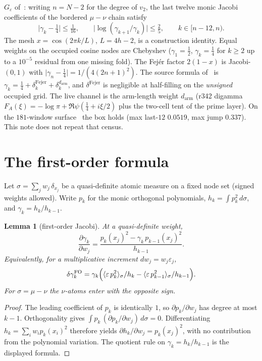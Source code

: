 \documentclass[11pt]{article}
\newtheorem{lemma}{Lemma}
\theoremstyle{remark}
\begin{document}
$G_\varepsilon$ of~\cite{v3p}: writing $n=N-2$
for the degree of $v_2$, the last twelve monic Jacobi coefficients
of the bordered $\mu-\nu$ chain satisfy
\begin{equation}\label{eq:geps}
\bigl\lvert\gamma_k-\tfrac14\bigr\rvert\le\tfrac1{16},
\qquad
\bigl\lvert\log(\gamma_{k+1}/\gamma_k)\bigr\rvert\le\tfrac25,
\qquad
k\in[n-12,n).
\end{equation}
The mesh $x=\cos(2\pi k/L)$, $L=4h-2$, is a construction identity.
Equal weights on the occupied cosine nodes are Chebyshev
($\gamma_1=\tfrac12$, $\gamma_k=\tfrac14$ for $k\ge 2$ up to a
$10^{-5}$ residual from one missing fold).
The Fej\'er factor $2(1-x)$ is Jacobi-$(0,1)$ with
$\lvert\gamma_n-\tfrac14\rvert=1/(4(2n+1)^2)$.
The source formula of~\cite{v3p} is
$\gamma_k=\tfrac14+\delta_k^{\mathrm{Fejer}}+\delta_k^{d_{\mathrm{arm}}}$,
and $\delta^{\mathrm{Fejer}}$ is negligible at half-filling on the
\emph{unsigned} occupied grid.
The live channel is the arm-length weight $d_{\mathrm{arm}}$
(r342 digamma $F_A(\xi)=-\log\pi+\Re\psi(\tfrac14+i\xi/2)$ plus
the two-cell tent of the prime layer).
On the $181$-window surface~\cite{v3p} the box holds
(max last-$12$ $0.0519$, max jump $0.337$).
This note does not repeat that census.

\section{The first-order formula}\label{sec:fo}

Let $\sigma=\sum_j w_j\,\delta_{x_j}$ be a quasi-definite atomic
measure on a fixed node set (signed weights allowed).
Write $p_k$ for the monic orthogonal polynomials,
$h_k=\int p_k^2\,d\sigma$, and $\gamma_k=h_k/h_{k-1}$.

\begin{lemma}[first-order Jacobi]\label{lem:fo}
At a quasi-definite weight,
\[
\frac{\partial\gamma_k}{\partial w_j}
=
\frac{p_k(x_j)^2-\gamma_k\,p_{k-1}(x_j)^2}{h_{k-1}}.
\]
Equivalently, for a multiplicative increment $dw_j=w_j\varepsilon_j$,
\[
\delta\gamma_k^{\mathrm{FO}}
=
\gamma_k\Bigl(\langle\varepsilon\,p_k^2\rangle_\sigma/h_k
-\langle\varepsilon\,p_{k-1}^2\rangle_\sigma/h_{k-1}\Bigr).
\]
For $\sigma=\mu-\nu$ the $\nu$-atoms enter with the opposite sign.
\end{lemma}

\begin{proof}
The leading coefficient of $p_k$ is identically $1$, so
$\partial p_k/\partial w_j$ has degree at most $k-1$.
Orthogonality gives $\int p_k\,(\partial p_k/\partial w_j)\,d\sigma=0$.
Differentiating $h_k=\sum_i w_i p_k(x_i)^2$ therefore yields
$\partial h_k/\partial w_j=p_k(x_j)^2$, with no contribution from
the polynomial variation.
The quotient rule on $\gamma_k=h_k/h_{k-1}$ is the displayed formula.
\end{proof}
\end{document}
